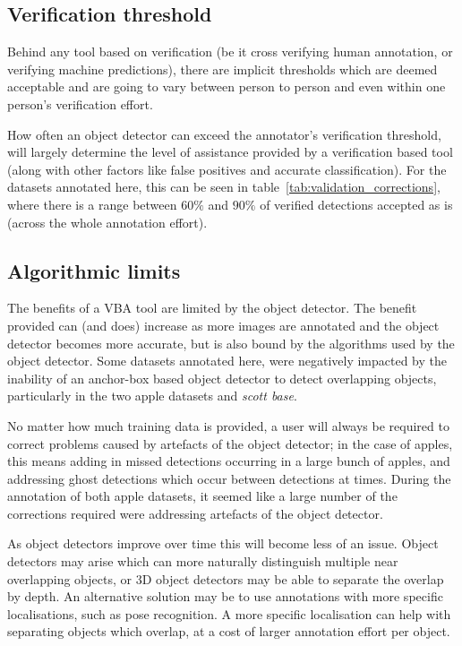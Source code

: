\subsection{Verification threshold}
\label{sec:verification_threshold}

Behind any tool based on verification (be it cross verifying human annotation, or verifying machine predictions), there are implicit thresholds which are deemed acceptable and are going to vary between person to person and even within one person's verification effort. 

How often an object detector can exceed the annotator's verification threshold, will largely determine the level of assistance provided by a verification based tool (along with other factors like false positives and accurate classification). For the datasets annotated here, this can be seen in table~\ref{tab:validation_corrections}, where there is a range between $60\%$ and $90\%$ of verified detections accepted as is (across the whole annotation effort). 

\subsection{Algorithmic limits}
\label{sec:machine_limits}

The benefits of a \gls{VBA} tool are limited by the object detector. The benefit provided can (and does) increase as more images are annotated and the object detector becomes more accurate, but is also bound by the algorithms used by the object detector. Some datasets annotated here, were negatively impacted by the inability of an anchor-box based object detector to detect overlapping objects, particularly in the two apple datasets and \emph{scott base}. 

No matter how much training data is provided, a user will always be required to correct problems caused by artefacts of the object detector; in the case of apples, this means adding in missed detections occurring in a large bunch of apples, and addressing ghost detections which occur between detections at times. During the annotation of both apple datasets, it seemed like a large number of the corrections required were addressing artefacts of the object detector.

As object detectors improve over time this will become less of an issue. Object detectors may arise which can more naturally distinguish multiple near overlapping objects, or 3D object detectors may be able to separate the overlap by depth. An alternative solution may be to use annotations with more specific localisations, such as pose recognition. A more specific localisation can help with separating objects which overlap, at a cost of larger annotation effort per object.


